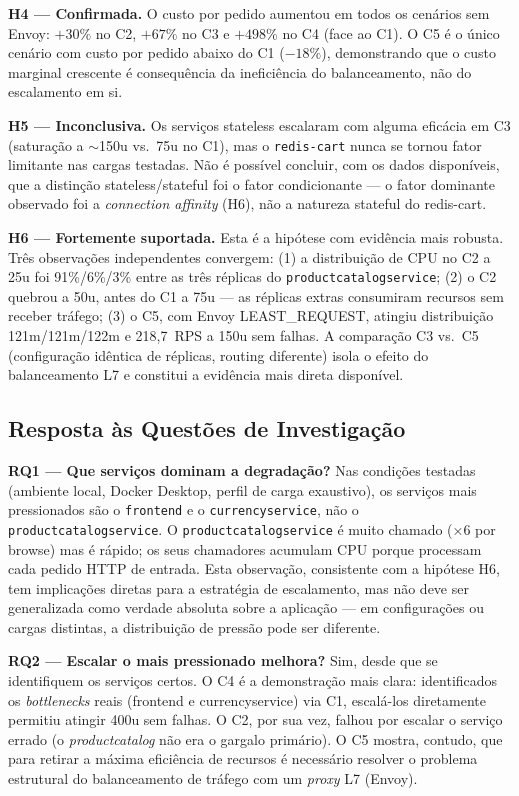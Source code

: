 \documentclass[manuscript,screen,review]{acmart}
\begin{document}
\textbf{H4 — Confirmada.} O custo por pedido aumentou em todos os cenários sem Envoy: $+30\%$ no C2, $+67\%$ no C3 e $+498\%$ no C4 (face ao C1). O C5 é o único cenário com custo por pedido abaixo do C1 ($-18\%$), demonstrando que o custo marginal crescente é consequência da ineficiência do balanceamento, não do escalamento em si.

\textbf{H5 — Inconclusiva.} Os serviços stateless escalaram com alguma eficácia em C3 (saturação a $\sim$150u vs.\ 75u no C1), mas o \texttt{redis-cart} nunca se tornou fator limitante nas cargas testadas. Não é possível concluir, com os dados disponíveis, que a distinção stateless/stateful foi o fator condicionante — o fator dominante observado foi a \textit{connection affinity} (H6), não a natureza stateful do redis-cart.

\textbf{H6 — Fortemente suportada.} Esta é a hipótese com evidência mais robusta. Três observações independentes convergem: (1) a distribuição de CPU no C2 a 25u foi 91\%/6\%/3\% entre as três réplicas do \texttt{productcatalogservice}; (2) o C2 quebrou a 50u, antes do C1 a 75u — as réplicas extras consumiram recursos sem receber tráfego; (3) o C5, com Envoy LEAST\_REQUEST, atingiu distribuição 121m/121m/122m e 218{,}7~RPS a 150u sem falhas. A comparação C3 vs.\ C5 (configuração idêntica de réplicas, routing diferente) isola o efeito do balanceamento L7 e constitui a evidência mais direta disponível.

\subsection{Resposta às Questões de Investigação}

\textbf{RQ1 — Que serviços dominam a degradação?} Nas condições testadas (ambiente local, Docker Desktop, perfil de carga exaustivo), os serviços mais pressionados são o \texttt{frontend} e o \texttt{currencyservice}, não o \texttt{productcatalogservice}. O \texttt{productcatalogservice} é muito chamado (×6 por browse) mas é rápido; os seus chamadores acumulam CPU porque processam cada pedido HTTP de entrada. Esta observação, consistente com a hipótese H6, tem implicações diretas para a estratégia de escalamento, mas não deve ser generalizada como verdade absoluta sobre a aplicação — em configurações ou cargas distintas, a distribuição de pressão pode ser diferente.

\textbf{RQ2 — Escalar o mais pressionado melhora?} Sim, desde que se identifiquem os serviços certos. O C4 é a demonstração mais clara: identificados os \textit{bottlenecks} reais (frontend e currencyservice) via C1, escalá-los diretamente permitiu atingir 400u sem falhas. O C2, por sua vez, falhou por escalar o serviço errado (o \textit{productcatalog} não era o gargalo primário). O C5 mostra, contudo, que para retirar a máxima eficiência de recursos é necessário resolver o problema estrutural do balanceamento de tráfego com um \textit{proxy} L7 (Envoy).
\end{document}
